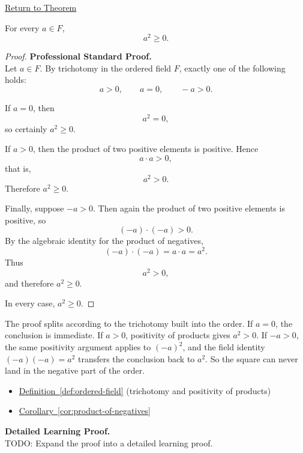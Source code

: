 \newpage
{}
\label{prf:squares-nonnegative}

\begin{remark*}[Return]
\hyperref[thm:squares-nonnegative]{Return to Theorem}
\end{remark*}

\begin{theorem*}
For every $a\in F$,
\[
a^2\ge 0.
\]
\end{theorem*}

\begin{proof}
\textbf{Professional Standard Proof.}~\\
Let $a\in F$.  By trichotomy in the ordered field $F$, exactly one of the
following holds:
\[
a>0,\qquad a=0,\qquad -a>0.
\]

If $a=0$, then
\[
a^2=0,
\]
so certainly $a^2\ge 0$.

If $a>0$, then the product of two positive elements is positive.  Hence
\[
a\cdot a>0,
\]
that is,
\[
a^2>0.
\]
Therefore $a^2\ge 0$.

Finally, suppose $-a>0$.  Then again the product of two positive elements is
positive, so
\[
(-a)\cdot(-a)>0.
\]
By the algebraic identity for the product of negatives,
\[
(-a)\cdot(-a)=a\cdot a=a^2.
\]
Thus
\[
a^2>0,
\]
and therefore $a^2\ge 0$.

In every case, $a^2\ge 0$.
\end{proof}

\begin{remark*}
The proof splits according to the trichotomy built into the order.  If
$a=0$, the conclusion is immediate.  If $a>0$, positivity of products gives
$a^2>0$.  If $-a>0$, the same positivity argument applies to $(-a)^2$, and
the field identity $(-a)(-a)=a^2$ transfers the conclusion back to $a^2$.
So the square can never land in the negative part of the order.
\end{remark*}

\begin{dependencies}
\begin{itemize}
  \item \hyperref[def:ordered-field]{Definition~\ref*{def:ordered-field}}
        \textnormal{(trichotomy and positivity of products)}
  \item \hyperref[cor:product-of-negatives]{Corollary~\ref*{cor:product-of-negatives}}
\end{itemize}
\end{dependencies}

\textbf{Detailed Learning Proof.}~\\
TODO: Expand the proof into a detailed learning proof.

